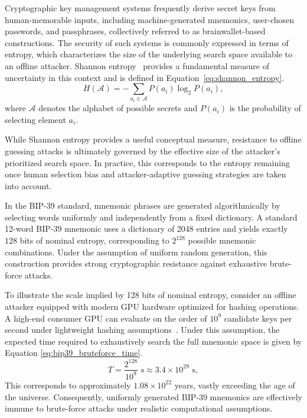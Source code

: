 \documentclass[mathematics,article,accept,pdftex,moreauthors]{Definitions/mdpi}
\begin{document}
Cryptographic key management systems frequently derive secret keys from human-memorable inputs, including machine-generated mnemonics, user-chosen passwords, and passphrases, collectively referred to as brainwallet-based constructions. The security of such systems is commonly expressed in terms of entropy, which characterizes the size of the underlying search space available to an offline attacker. Shannon entropy~\cite{Shannon1948} provides a fundamental measure of uncertainty in this context and is defined in Equation~\eqref{eq:shannon_entropy}.
\begin{equation}
H(\mathcal{A}) = -\sum_{a_i \in \mathcal{A}} P(a_i)\log_2 P(a_i),
\label{eq:shannon_entropy}
\end{equation}
where $\mathcal{A}$ denotes the alphabet of possible secrets and $P(a_i)$ is the probability of selecting element $a_i$.

While Shannon entropy provides a useful conceptual measure, resistance to offline guessing attacks is ultimately governed by the effective size of the attacker’s prioritized search space. In practice, this corresponds to the entropy remaining once human selection bias and attacker-adaptive guessing strategies are taken into account.

In the BIP-39 standard, mnemonic phrases are generated algorithmically by selecting words uniformly and independently from a fixed dictionary. A standard 12-word BIP-39 mnemonic uses a dictionary of 2048 entries and yields exactly \(128\) bits of nominal entropy, corresponding to \(2^{128}\) possible mnemonic combinations. Under the assumption of uniform random generation, this construction provides strong cryptographic resistance against exhaustive brute-force attacks.

To illustrate the scale implied by 128 bits of nominal entropy, consider an offline attacker equipped with modern GPU hardware optimized for hashing operations. A high-end consumer GPU can evaluate on the order of $10^{9}$ candidate keys per second under lightweight hashing assumptions~\cite{Choi2024,Qiu2016,Durmuth2015}. Under this assumption, the expected time required to exhaustively search the full mnemonic space is given by Equation \eqref{eq:bip39_bruteforce_time}.
\begin{equation}
T = \frac{2^{128}}{10^{9}} \text{ s} \approx 3.4 \times 10^{29} \text{ s},
\label{eq:bip39_bruteforce_time}
\end{equation}
\noindent This corresponds to approximately $1.08 \times 10^{22}$ years, vastly exceeding the age of the universe. Consequently, uniformly generated BIP-39 mnemonics are effectively immune to brute-force attacks under realistic computational assumptions.
\end{document}
